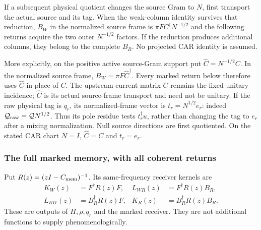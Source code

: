 \documentclass[12pt,a4paper]{article}
\begin{document}
If a subsequent physical quotient changes the source Gram to $N$, first
transport the actual source and its tag. When the weak-column identity
survives that reduction, $B_W$ in the normalized source frame is
$\pi F C^\dagger N^{-1/2}$ and the following returns acquire the two
outer $N^{-1/2}$ factors. If the reduction produces additional columns,
they belong to the complete $B_R$. No projected CAR identity is assumed.

More explicitly, on the positive active source-Gram support put
$\widehat C=N^{-1/2}C$. In the normalized source frame,
$B_W=\pi F\widehat C^\dagger$. Every marked return below therefore uses
$\widehat C$ in place of $C$. The upstream current matrix $C$ remains
the fixed unitary incidence; $\widehat C$ is its actual source-frame
transport and need not be unitary. If the raw physical tag is $q_r$,
its normalized-frame vector is $t_r=N^{1/2}e_r$: indeed
$\mathcal Q_{\rm raw}=\mathcal QN^{1/2}$. Thus its pole residue tests
$t_r^\dagger u$, rather than changing the tag to $e_r$ after a mixing
normalization. Null source directions are first quotiented. On the stated
CAR chart $N=I$, $\widehat C=C$ and $t_r=e_r$.

\subsubsection{The full marked memory, with all coherent returns}
Put $R(z)=(zI-C_{\rm mem})^{-1}$. Its same-frequency receiver kernels are
\[
\begin{aligned}
 K_W(z)&=F^\dagger R(z)F,&
 L_{WR}(z)&=F^\dagger R(z)B_R,\\
 L_{RW}(z)&=B_R^\dagger R(z)F,&
 K_R(z)&=B_R^\dagger R(z)B_R.
\end{aligned}
\]
These are outputs of $H,\rho,q_r$ and the marked receiver. They are not
additional functions to supply phenomenologically.
\end{document}
